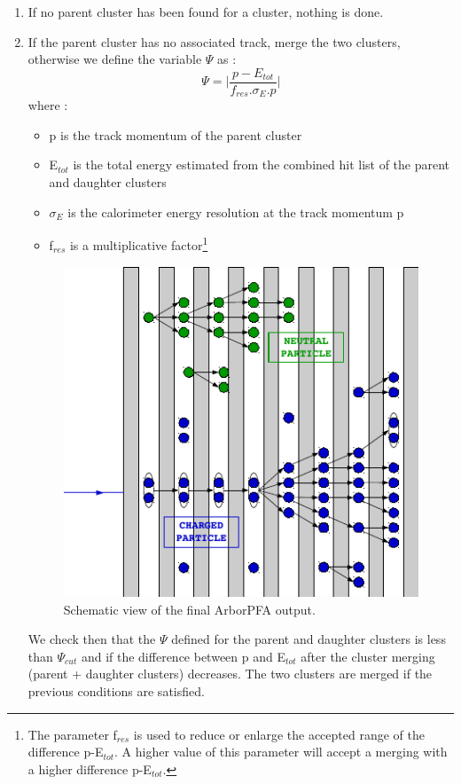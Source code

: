 \documentclass[12pt]{article}
\begin{document}
\begin{enumerate}
  \item If no parent cluster has been found for a cluster, nothing is done.
  \item If the parent cluster has no associated track, merge the two clusters, otherwise we define the variable $\Psi$ as :
  \begin{equation}
    \label{PSI2_ALGORITHM_EQUATION}
    \Psi = \Big| \frac{p-E_{tot}}{f_{res} . \sigma_E . p} \Big|
  \end{equation}
  where :
  \begin{itemize}
    \item p is the track momentum of the parent cluster
    \item E$_{tot}$ is the total energy estimated from the combined hit list of the parent and daughter clusters
    \item $\sigma_E$ is the calorimeter energy resolution at the track momentum p
    \item f$_{res}$ is a multiplicative factor\footnote{The parameter f$_{res}$ is used to reduce or enlarge the accepted range of the difference p-E$_{tot}$. A higher value of this parameter will accept a merging with a higher difference p-E$_{tot}$.}
  \end{itemize}
  
\begin{figure}[!h]
  \begin{center}
    \includegraphics[width=0.4\linewidth]{PfoCreation.pdf}
  \end{center}
  \caption{\label{ARBOR_PFO_CREATION} Schematic view of the final ArborPFA output.}
\end{figure}

We check then that the $\Psi$ defined for the parent and daughter clusters is less than $\Psi_{cut}$ and if the difference between p and E$_{tot}$ after the cluster merging (parent + daughter clusters) decreases. The two clusters are merged if the previous conditions are satisfied.

\end{enumerate}
\end{document}
